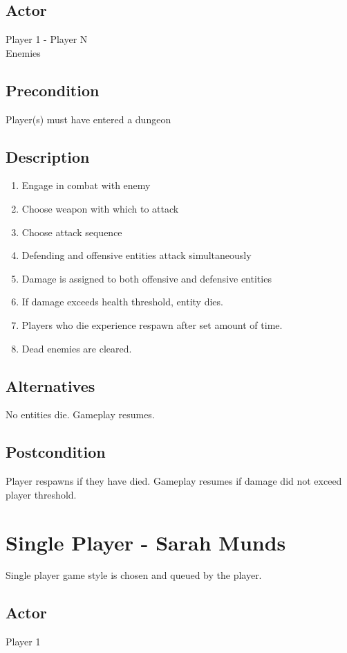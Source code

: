 \documentclass[11pt]{article}
\begin{document}
		\subsection{Actor}
		Player 1 - Player N
		\\Enemies

		\subsection{Precondition}
 		Player(s) must have entered a dungeon

		\subsection{Description}
			\begin{enumerate}
			\item Engage in combat with enemy
			\item Choose weapon with which to attack
			\item Choose attack sequence
			\item Defending and offensive entities attack simultaneously
			\item Damage is assigned to both offensive and defensive entities
			\item If damage exceeds health threshold, entity dies. 
			\item Players who die experience respawn after set amount of time.
			\item Dead enemies are cleared. 
			\end{enumerate}

		\subsection{Alternatives}
			No entities die. Gameplay resumes. 

		\subsection{Postcondition}
			Player respawns if they have died. Gameplay resumes if damage did not exceed player threshold.


	\section{Single Player - Sarah Munds}
	Single player game style is chosen and queued by the player. 

		\subsection{Actor}
			Player 1
\end{document}
